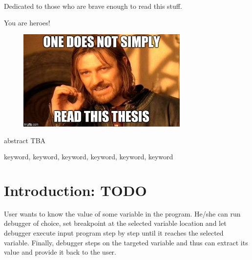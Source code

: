 \documentclass[12pt, twoside]{fithesis2}
\renewcommand{\_}{\leavevmode \kern0.07em\vbox{\hrule width0.4em}}
\begin{document}
\FrontMatter
\ThesisTitlePage

%
%
%
%

\begin{ThesisDeclaration}
    \DeclarationText
    \AdvisorName
\end{ThesisDeclaration}

\begin{ThesisThanks}
Dedicated to those who are brave enough to read this stuff.

You are heroes!

\bigskip
\begin{figure}[ht]
    \includegraphics[width=320px]{images/one_does_not_simply.jpg}
\end{figure}

\end{ThesisThanks}

\begin{ThesisAbstract}
    abstract TBA
\end{ThesisAbstract}

\begin{ThesisKeyWords}
    keyword, keyword, keyword, keyword, keyword, keyword
\end{ThesisKeyWords}


\MainMatter
\tableofcontents



\chapter{Introduction: TODO}
\label{chap:intro}

User wants to know the value of some variable in the program. He/she can run
debugger of choice, set breakpoint at the selected variable location and let
debugger execute input program step by step until it reaches the selected
variable. Finally, debugger steps on the targeted variable and thus can extract
its value and provide it back to the user.
\end{document}

